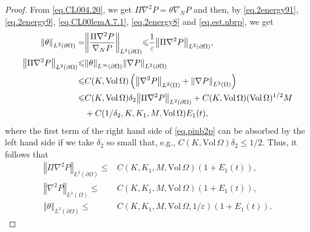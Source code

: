 \documentclass[12pt,reqno]{amsart}
\numberwithin{equation}{section}
\theoremstyle{definition}
\theoremstyle{remark}
\begin{document}
\begin{proof}
From \eqref{eq.CL004.20}, we get $\Pi{\nabla}^2{P }=\theta {\nabla}_N{P }$ and then, by \eqref{eq.2energy91}, \eqref{eq.2energy9}, \eqref{eq.CL00lemA.7.1}, \eqref{eq.2energy8} and \eqref{eq.est.nbrp}, we get
\begin{align}
  {\left\Vert{\theta}\right\Vert}_{L^2({\partial}\Omega)}=&{\left\Vert{\frac{\Pi{\nabla}^2{P }}{{\nabla}_N{P }}}\right\Vert}_{L^2({\partial}\Omega)}{\leqslant} \frac{1}{\varepsilon} {\left\Vert{\Pi{\nabla}^2{P }}\right\Vert}_{L^2({\partial}\Omega)},\\
  {\left\Vert{\Pi{\nabla}^2{P }}\right\Vert}_{L^2({\partial}\Omega)}{\leqslant}& {\left\Vert{\theta}\right\Vert}_{L^\infty({\partial}\Omega)}{\left\Vert{{\nabla}{P }}\right\Vert}_{L^2({\partial}\Omega)}{\nonumber}\\
  {\leqslant}&C(K,{\mathrm{Vol}\,}\Omega)\left({\left\Vert{{\nabla}^2{P }}\right\Vert}_{L^2(\Omega)}+{\left\Vert{{\nabla}{P }}\right\Vert}_{L^2(\Omega)}\right){\nonumber}\\
  {\leqslant}&C(K,{\mathrm{Vol}\,}\Omega)\delta_2{\left\Vert{\Pi{\nabla}^2{P }}\right\Vert}_{L^2({\partial}\Omega)} +C(K,{\mathrm{Vol}\,}\Omega)({\mathrm{Vol}\,}\Omega)^{1/2} M{\nonumber}\\
  &+C(1/\delta_2,K,K_1,M,{\mathrm{Vol}\,}\Omega)E_1(t),\label{eq.pinb2p}
\end{align}
where the first term of the right hand side of \eqref{eq.pinb2p} can be absorbed by the left hand side if we take $\delta_2$ so small that, e.g., $C(K,{\mathrm{Vol}\,}\Omega)\delta_2{\leqslant} 1/2$. Thus, it follows that
\begin{align}
  {\left\Vert{\Pi{\nabla}^2{P }}\right\Vert}_{L^2({\partial}\Omega)}{\leqslant}&C(K,K_1,M,{\mathrm{Vol}\,}\Omega)(1+E_1(t)),\\
  {\left\Vert{{\nabla}^2{P }}\right\Vert}_{L^2(\Omega)}{\leqslant}&C(K,K_1,M,{\mathrm{Vol}\,}\Omega)(1+E_1(t)),\label{eq.nb2p}\\
  {\left\Vert{\theta}\right\Vert}_{L^2({\partial}\Omega)}{\leqslant}&C(K,K_1,M,{\mathrm{Vol}\,}\Omega,1/{\varepsilon})(1+E_1(t)).\label{eq.theta}
\end{align}


\end{proof}
\end{document}
